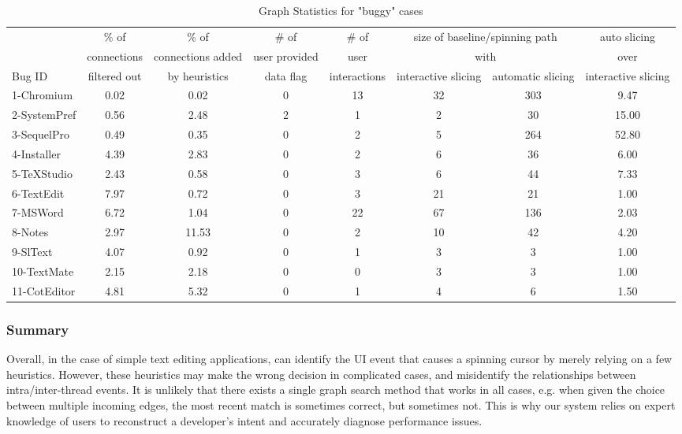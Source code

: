 \begin{table*}[ht]
\footnotesize
\centering
  \begin{tabularx}{\textwidth}{l|ccccccc}
 	   & \% of & \% of & \# of& \# of & \multicolumn{2}{c}{size of baseline/spinning path}& auto slicing\\
       & connections & connections added  & user provided & user  & \multicolumn{2}{c}{with}  & over \\
Bug ID & filtered out & by heuristics & data flag & interactions & interactive slicing & automatic slicing &  interactive slicing\\
\hline
\hline
1-Chromium & 0.02 & 0.02 & 0 & 13 & 32 & 303 & 9.47\\
2-SystemPref & 0.56 & 2.48 & 2 & 1 & 2 & 30 & 15.00\\
3-SequelPro & 0.49 & 0.35 & 0 & 2 & 5 & 264 & 52.80\\
4-Installer & 4.39 & 2.83 & 0 & 2 & 6 & 36  & 6.00\\
5-TeXStudio & 2.43 & 0.58 & 0 & 3 & 6 & 44  & 7.33\\
6-TextEdit & 7.97 & 0.72 & 0 & 3 & 21 & 21 & 1.00\\
7-MSWord & 6.72 & 1.04 & 0 & 22 & 67 & 136 & 2.03\\
8-Notes & 2.97 & 11.53 & 0 & 2 & 10 & 42 & 4.20\\
9-SlText & 4.07 & 0.92 & 0 & 1 & 3 & 3 & 1.00\\
10-TextMate & 2.15 & 2.18 & 0 & 0 & 3 & 3 & 1.00\\
11-CotEditor & 4.81 & 5.32 & 0 & 1 & 4 & 6 & 1.50\\
\hline
  \end{tabularx}
  \parbox{\textwidth}
  {\caption{Graph Statistics for "buggy" cases} 
    {
    }
  \label{table:results}
  }

\end{table*}



\subsubsection{Summary}
Overall, in the case of simple text editing applications, \xxx can identify the
UI event that causes a spinning cursor by merely relying on a few heuristics.
However, these heuristics may make the wrong decision in complicated cases, and
misidentify the relationships between intra/inter-thread events. It is unlikely
that there exists a single graph search method that works in all cases, e.g.
when given the choice between multiple incoming edges, the most recent match is
sometimes correct, but sometimes not. This is why our system relies on expert
knowledge of users to reconstruct a developer's intent and accurately diagnose
performance issues.
